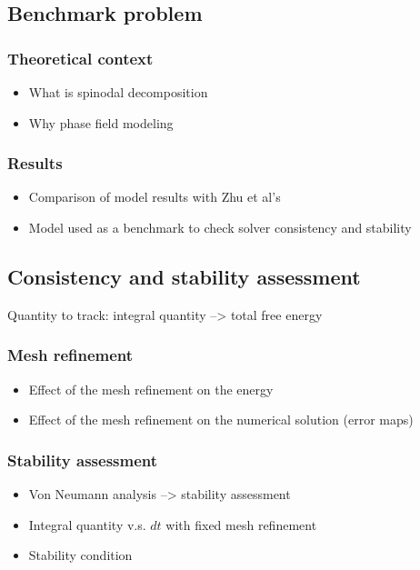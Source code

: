 \subsection{Benchmark problem}
    \subsubsection{Theoretical context}
    \begin{itemize}
        \item What is spinodal decomposition
        \item Why phase field modeling
    \end{itemize}
    \subsubsection{Results}
    \begin{itemize}
        \item Comparison of model results with Zhu et al's
        \item Model used as a benchmark to check solver consistency and stability
    \end{itemize}
\subsection{Consistency and stability assessment}
    Quantity to track: integral quantity --> total free energy
    \subsubsection{Mesh refinement}
    \begin{itemize}
        \item Effect of the mesh refinement on the energy
        \item Effect of the mesh refinement on the numerical solution (error maps)
    \end{itemize}
    \subsubsection{Stability assessment}
    \begin{itemize}
        \item Von Neumann analysis --> stability assessment
        \item Integral quantity v.s. $dt$ with fixed mesh refinement
        \item Stability condition
    \end{itemize}
